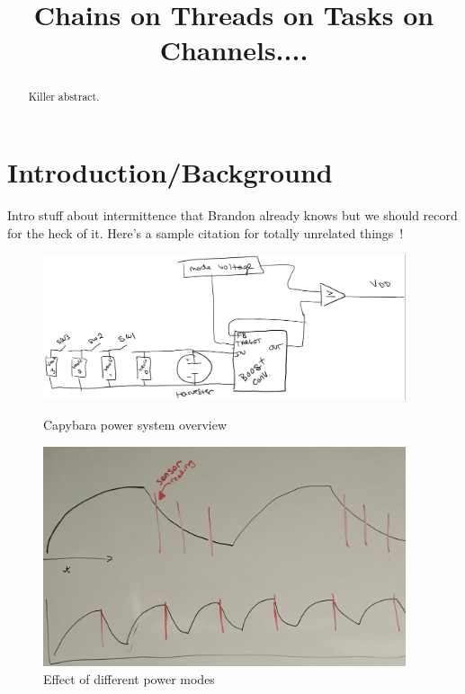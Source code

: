 \documentclass[10pt]{sensys-proc}
\title{Chains on Threads on Tasks on Channels....}
\begin{document}
\maketitle

\begin{abstract}
Killer abstract. 
\end{abstract}

\section{Introduction/Background}
  \label{sec:intro}
Intro stuff about intermittence that Brandon already knows but we should record for the
heck of it. Here's a sample citation for totally unrelated things~\cite{RC,Grace}!
  
\begin{figure}
\centering
\begin{minipage}[b]{0.49\textwidth}
  \includegraphics[width=0.95\textwidth,center]{capybara-all.png}
\caption{Capybara power system overview}\label{label-a}
\end{minipage}\hfill
\begin{minipage}[b]{0.49\textwidth}
  \includegraphics[width=0.95\textwidth,center]{power_modes.pdf}
\caption{Effect of different power modes}\label{label-b}
\end{minipage}
\end{figure}
\end{document}
